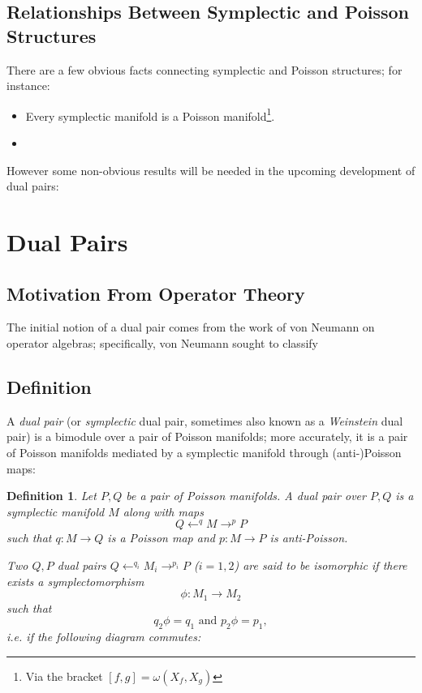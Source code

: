 \documentclass{tufte-handout}
\newtheorem{defn}{Definition}
\begin{document}
\subsection{Relationships Between Symplectic and Poisson Structures}
There are a few obvious facts connecting symplectic and Poisson structures; for instance:
\begin{itemize}
\item Every symplectic manifold is a Poisson manifold\footnote{Via the bracket $[f,g] = \omega(X_f,X_g)$}.

\item 

\end{itemize}

However some non-obvious results will be needed in the upcoming development of dual pairs:



\section{Dual Pairs}
\subsection{Motivation From Operator Theory}
The initial notion of a dual pair comes from the work of von Neumann on operator algebras; specifically, von Neumann sought to classify %

\subsection{Definition}
A \emph{dual pair} (or \emph{symplectic} dual pair, sometimes also known as a \emph{Weinstein} dual pair) is a bimodule over a pair of Poisson manifolds; more accurately, it is a pair of Poisson manifolds mediated by a symplectic manifold through (anti-)Poisson maps:

\begin{defn}
Let $P,Q$ be a pair of Poisson manifolds. A \emph{dual pair} over $P,Q$ is a symplectic manifold $M$ along with maps
$$
Q \leftarrow^q M \to^p P
$$
such that $q: M \to Q$ is a Poisson map and $p: M \to P$ is anti-Poisson.

Two $Q,P$ dual pairs $Q \leftarrow^{q_i} M_i \to^{p_i} P$ ($i = 1,2$) are said to be \emph{isomorphic} if there exists a symplectomorphism
$$
\phi: M_1 \to M_2
$$
such that
$$
q_2\phi = q_1 \mbox{ and } p_2\phi = p_1,
$$
i.e. if the following diagram commutes:
\end{defn}
\end{document}
